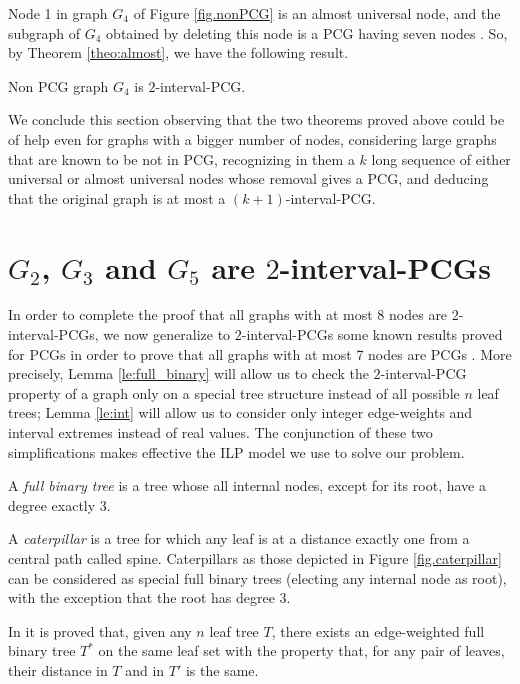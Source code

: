 \documentclass{fundam}
\newcommand{\Int}[1]{$#1$\textnormal{-interval-PCG}}
\begin{document}
\noindent
Node 1 in graph $G_4$ of Figure \ref{fig.nonPCG} is an almost universal node, and the subgraph of $G_4$ obtained by deleting this node is a PCG having seven nodes \cite{Calamoneri2012}.
So, by Theorem \ref{theo:almost},
we have the following result.

\begin{corollary}
Non PCG graph $G_4$ is \Int{2}.
\end{corollary}

We conclude this section observing that the two theorems proved above could be of help even for graphs with a bigger number of nodes, considering large graphs that are known to be not in PCG, recognizing in them a $k$ long sequence of either universal or almost universal nodes whose removal gives a PCG, and deducing that the original graph is at most a \Int{(k+1)}.

\section{$G_2$, $G_3$ and $G_5$ are \Int{2}s}

In order to complete the proof that all graphs with at most 8 nodes are \Int{2}s, we now generalize to \Int{2}s some known results proved for PCGs in order to prove that all graphs with at most 7 nodes are PCGs \cite{Calamoneri2013}.
More precisely, Lemma \ref{le:full_binary}
will allow us to check
the \Int{2} property of a graph only on a special tree structure instead of all possible $n$ leaf trees; Lemma \ref{le:int} will allow us to consider only integer edge-weights and interval extremes instead of real values.
The conjunction of these two simplifications makes effective the ILP model we use to solve our problem.

A {\em full binary tree} is a tree whose all internal nodes, except for its root, have a degree exactly 3.

A {\em caterpillar} is a tree for which any leaf is at a distance exactly one from a central path called spine.
Caterpillars as those depicted in Figure \ref{fig.caterpillar} can be considered as special full binary trees (electing any internal node as root), with the exception that the root has degree 3.

In \cite{Calamoneri2013} it is proved that, given any $n$ leaf tree $T$, there exists an edge-weighted full binary tree $T^*$ on the same leaf set with the property that, for any pair of leaves, their distance in $T$ and in $T'$ is the same.
\end{document}
